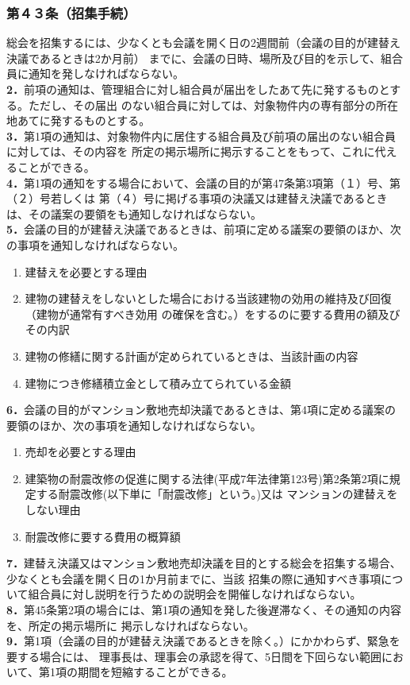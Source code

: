 \documentclass[
  luatex,
  paper=a4paper,
  fontsize=11pt,
  jafontsize=11pt,
  jlreq_notes,
]{jlreq}
\begin{document}
  \subsubsection*{第４３条（招集手続）}
  総会を招集するには、少なくとも会議を開く日の2週間前（会議の目的が建替え決議であるときは2か月前）
  までに、会議の日時、場所及び目的を示して、組合員に通知を発しなければならない。\\
  \textbf{2．}前項の通知は、管理組合に対し組合員が届出をしたあて先に発するものとする。ただし、その届出
  のない組合員に対しては、対象物件内の専有部分の所在地あてに発するものとする。\\
  \textbf{3．}第1項の通知は、対象物件内に居住する組合員及び前項の届出のない組合員に対しては、その内容を
  所定の掲示場所に掲示することをもって、これに代えることができる。\\
  \textbf{4．}第1項の通知をする場合において、会議の目的が第47条第3項第（１）号、第（２）号若しくは
  第（４）号に掲げる事項の決議又は建替え決議であるときは、その議案の要領をも通知しなければならない。\\
  \textbf{5．}会議の目的が建替え決議であるときは、前項に定める議案の要領のほか、次の事項を通知しなければならない。
  \begin{enumerate}
    \item 建替えを必要とする理由
    \item 建物の建替えをしないとした場合における当該建物の効用の維持及び回復（建物が通常有すべき効用
          の確保を含む。）をするのに要する費用の額及びその内訳
    \item 建物の修繕に関する計画が定められているときは、当該計画の内容
    \item 建物につき修繕積立金として積み立てられている金額
  \end{enumerate}
  \textbf{6．}会議の目的がマンション敷地売却決議であるときは、第4項に定める議案の要領のほか、次の事項を通知しなければならない。
  \begin{enumerate}
    \item 売却を必要とする理由
    \item 建築物の耐震改修の促進に関する法律(平成7年法律第123号)第2条第2項に規定する耐震改修(以下単に「耐震改修」という。)又は
      マンションの建替えをしない理由
    \item 耐震改修に要する費用の概算額
  \end{enumerate}
  \textbf{7．}建替え決議又はマンション敷地売却決議を目的とする総会を招集する場合、少なくとも会議を開く日の1か月前までに、当該
  招集の際に通知すべき事項について組合員に対し説明を行うための説明会を開催しなければならない。\\
  \textbf{8．}第45条第2項の場合には、第1項の通知を発した後遅滞なく、その通知の内容を、所定の掲示場所に
  掲示しなければならない。\\
  \textbf{9．}第1項（会議の目的が建替え決議であるときを除く。）にかかわらず、緊急を要する場合には、
  理事長は、理事会の承認を得て、5日間を下回らない範囲において、第1項の期間を短縮することができる。\\
\end{document}
